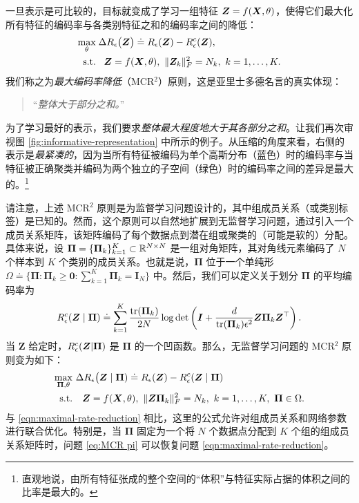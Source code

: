 \documentclass[../../book-main_zh.tex]{subfiles}
\begin{document}
一旦表示是可比较的，目标就变成了学习一组特征 $\bm{Z} = f(\bm{X}, \theta)$，使得它们最大化所有特征的编码率与各类别特征之和的编码率之间的降低：
\begin{equation}
	\begin{aligned}
		\max_{\theta } & \;  \Delta R_{\epsilon}\big(\Z \big) \doteq R_{\epsilon}(\Z) - R_{\epsilon}^c(\Z ), \\
		\mbox{s.t.} & \ \ \, \Z = f(\bm X, \theta),\  \|\Z_k\|_F^2                                          = N_k,\ k=1,\dots,K. 
	\end{aligned}
	\label{eqn:maximal-rate-reduction}
\end{equation}
我们称之为{\em 最大编码率降低}（MCR$^2$）原则，这是亚里士多德名言的真实体现：
\begin{quote}
	\centering
	“{\em 整体大于部分之和。}”
\end{quote}
为了学习最好的表示，我们要求{\em 整体最大程度地大于其各部分之和}。让我们再次审视图 \ref{fig:informative-representation} 中所示的例子。从压缩的角度来看，右侧的表示是{\em 最紧凑的}，因为当所有特征被编码为单个高斯分布（蓝色）时的编码率与当特征被正确聚类并编码为两个独立的子空间（绿色）时的编码率之间的差异是最大的。\footnote{直观地说，由所有特征张成的整个空间的“体积”与特征实际占据的体积之间的比率是最大的。}

 
    请注意，上述 MCR$^2$ 原则是为监督学习问题设计的，其中组成员关系（或类别标签）是已知的。然而，这个原则可以自然地扩展到无监督学习问题，通过引入一个成员关系矩阵，该矩阵编码了每个数据点到潜在组或聚类的（可能是软的）分配。具体来说，设 $\bm \Pi = \{\bm \Pi_k\}_{k=1}^K \subset \mathbb{R}^{N\times N}$ 是一组对角矩阵，其对角线元素编码了 $N$ 个样本到 $K$ 个类别的成员关系。也就是说，$\bm \Pi$ 位于一个单纯形 $\Omega \doteq \{\bm \Pi: \bm \Pi_k \ge \bm 0: \sum_{k=1}^K \bm \Pi_k = \bm I_N\}$ 中。然后，我们可以定义关于划分 $\bm \Pi$ 的平均编码率为
    \begin{align}\label{eq:MCRc}
        R_{\epsilon}^c(\bm{Z} \mid \bm \Pi) \doteq \sum_{k=1}^K \frac{\mathrm{tr}(\bm \Pi_k)}{2N}\log\det\left(\bm I + \frac{d}{\mathrm{tr}(\bm \Pi_k)\epsilon^2}\bm Z\bm \Pi_k \bm Z^\top \right).
    \end{align}
    当 $\bm Z$ 给定时，$R_{\epsilon}^c(\bm{Z} \vert \bm \Pi)$ 是 $\bm \Pi$ 的一个凹函数。那么，无监督学习问题的 MCR$^2$ 原则变为如下：
    \begin{align}\label{eq:MCR pi}
        \max_{\bm \Pi, \theta} & \  \Delta R_{\epsilon}\big(\bm{Z}  \mid \bm \Pi) \doteq R_{\epsilon}(\bm Z) - R_{\epsilon}^c(\bm{Z} \mid \bm \Pi) \notag \\ 
       \mathrm{s.t.}  & \ \ \ \bm Z = f(\bm X, \theta),\ \|\bm Z \bm \Pi_k\|_F^2 = N_k,\ k = 1,\dots,K,\ \bm\Pi \in \Omega. 
    \end{align}
    与 \eqref{eqn:maximal-rate-reduction} 相比，这里的公式允许对组成员关系和网络参数进行联合优化。特别是，当 $\bm \Pi$ 固定为一个将 $N$ 个数据点分配到 $K$ 个组的组成员关系矩阵时，问题 \eqref{eq:MCR pi} 可以恢复问题 \eqref{eqn:maximal-rate-reduction}。
 
\end{document}
